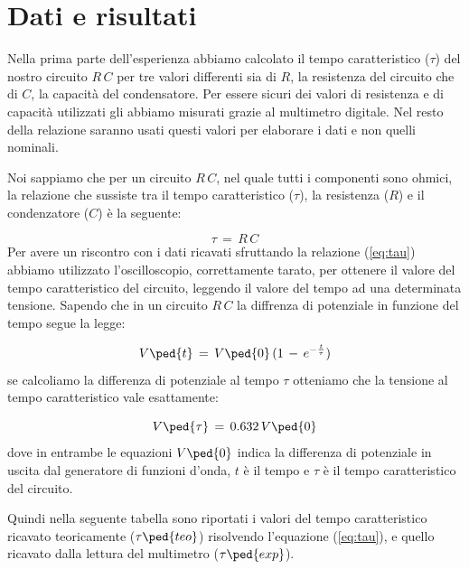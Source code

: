 \section*{Dati e risultati}

Nella prima parte dell'esperienza abbiamo calcolato il tempo caratteristico ($\tau$) del nostro circuito $R\,C$ per tre valori differenti sia di $R$, la resistenza del circuito che di $C$, la capacità del condensatore. Per essere sicuri dei valori di resistenza e di capacità utilizzati gli abbiamo misurati grazie al multimetro digitale. Nel resto della relazione saranno usati questi valori per elaborare i dati e non quelli nominali.

Noi sappiamo che per un circuito $R\,C$, nel quale tutti i componenti sono ohmici, la relazione che sussiste tra il tempo caratteristico ($\tau$), la resistenza ($R$) e il condenzatore ($C$) è la seguente:

\begin{equation}
	\tau \,=\, R\,C
	\label{eq:tau}
\end{equation}
%
Per avere un riscontro con i dati ricavati sfruttando la relazione (\ref{eq:tau}) abbiamo utilizzato l'oscilloscopio, correttamente tarato, per ottenere il valore del tempo caratteristico del circuito, leggendo il valore del tempo ad una determinata tensione. Sapendo che in un circuito $R\,C$ la diffrenza di potenziale in funzione del tempo segue la legge:

\begin{equation}
	V\ped{t} \,=\, V\ped{0}\,(1\,-\,e^{-\frac{t}{\tau}})
	\label{eq:potenziale}
\end{equation}
%
se calcoliamo la differenza di potenziale al tempo $\tau$ otteniamo che la tensione al tempo caratteristico vale esattamente:

\begin{equation}
	V\ped{\tau} \,=\, 0.632\,V\ped{0} 
\end{equation}
%
dove in entrambe le equazioni $V\ped{0}$ indica la differenza di potenziale in uscita dal generatore di funzioni d'onda, $t$ è il tempo e $\tau$ è il tempo caratteristico del circuito.

Quindi nella seguente tabella sono riportati i valori del tempo caratteristico ricavato teoricamente ($\tau\ped{teo}$) risolvendo l'equazione (\ref{eq:tau}), e quello ricavato dalla lettura del multimetro ($\tau\ped{exp}$).

